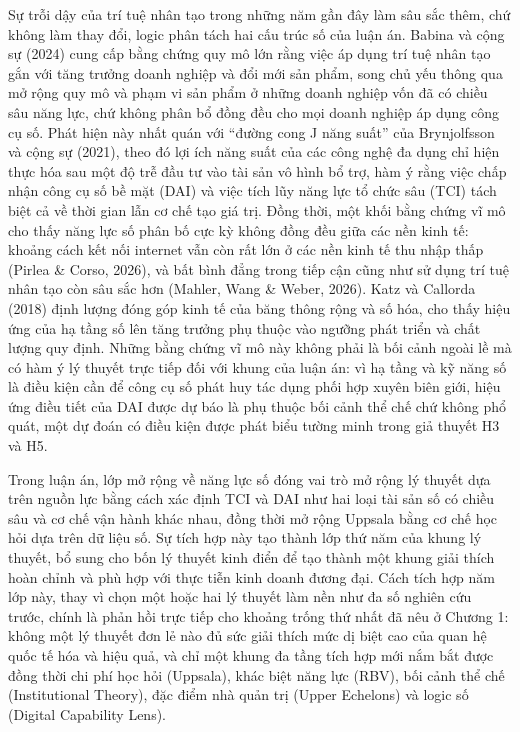 \documentclass[
  a4paper,
  13pt]{extreport}
\begin{document}
Sự trỗi dậy của trí tuệ nhân tạo trong những năm gần đây làm sâu sắc
thêm, chứ không làm thay đổi, logic phân tách hai cấu trúc số của luận
án. Babina và cộng sự (2024) cung cấp bằng chứng quy mô lớn rằng việc áp
dụng trí tuệ nhân tạo gắn với tăng trưởng doanh nghiệp và đổi mới sản
phẩm, song chủ yếu thông qua mở rộng quy mô và phạm vi sản phẩm ở những
doanh nghiệp vốn đã có chiều sâu năng lực, chứ không phân bổ đồng đều
cho mọi doanh nghiệp áp dụng công cụ số. Phát hiện này nhất quán với
``đường cong J năng suất'' của Brynjolfsson và cộng sự (2021), theo đó
lợi ích năng suất của các công nghệ đa dụng chỉ hiện thực hóa sau một độ
trễ đầu tư vào tài sản vô hình bổ trợ, hàm ý rằng việc chấp nhận công cụ
số bề mặt (DAI) và việc tích lũy năng lực tổ chức sâu (TCI) tách biệt cả
về thời gian lẫn cơ chế tạo giá trị. Đồng thời, một khối bằng chứng vĩ
mô cho thấy năng lực số phân bố cực kỳ không đồng đều giữa các nền kinh
tế: khoảng cách kết nối internet vẫn còn rất lớn ở các nền kinh tế thu
nhập thấp (Pirlea \& Corso, 2026), và bất bình đẳng trong tiếp cận cũng
như sử dụng trí tuệ nhân tạo còn sâu sắc hơn (Mahler, Wang \& Weber,
2026). Katz và Callorda (2018) định lượng đóng góp kinh tế của băng
thông rộng và số hóa, cho thấy hiệu ứng của hạ tầng số lên tăng trưởng
phụ thuộc vào ngưỡng phát triển và chất lượng quy định. Những bằng chứng
vĩ mô này không phải là bối cảnh ngoài lề mà có hàm ý lý thuyết trực
tiếp đối với khung của luận án: vì hạ tầng và kỹ năng số là điều kiện
cần để công cụ số phát huy tác dụng phối hợp xuyên biên giới, hiệu ứng
điều tiết của DAI được dự báo là phụ thuộc bối cảnh thể chế chứ không
phổ quát, một dự đoán có điều kiện được phát biểu tường minh trong giả
thuyết H3 và H5.

Trong luận án, lớp mở rộng về năng lực số đóng vai trò mở rộng lý thuyết
dựa trên nguồn lực bằng cách xác định TCI và DAI như hai loại tài sản số
có chiều sâu và cơ chế vận hành khác nhau, đồng thời mở rộng Uppsala
bằng cơ chế học hỏi dựa trên dữ liệu số. Sự tích hợp này tạo thành lớp
thứ năm của khung lý thuyết, bổ sung cho bốn lý thuyết kinh điển để tạo
thành một khung giải thích hoàn chỉnh và phù hợp với thực tiễn kinh
doanh đương đại. Cách tích hợp năm lớp này, thay vì chọn một hoặc hai lý
thuyết làm nền như đa số nghiên cứu trước, chính là phản hồi trực tiếp
cho khoảng trống thứ nhất đã nêu ở Chương 1: không một lý thuyết đơn lẻ
nào đủ sức giải thích mức dị biệt cao của quan hệ quốc tế hóa và hiệu
quả, và chỉ một khung đa tầng tích hợp mới nắm bắt được đồng thời chi
phí học hỏi (Uppsala), khác biệt năng lực (RBV), bối cảnh thể chế
(Institutional Theory), đặc điểm nhà quản trị (Upper Echelons) và logic
số (Digital Capability Lens).
\end{document}
